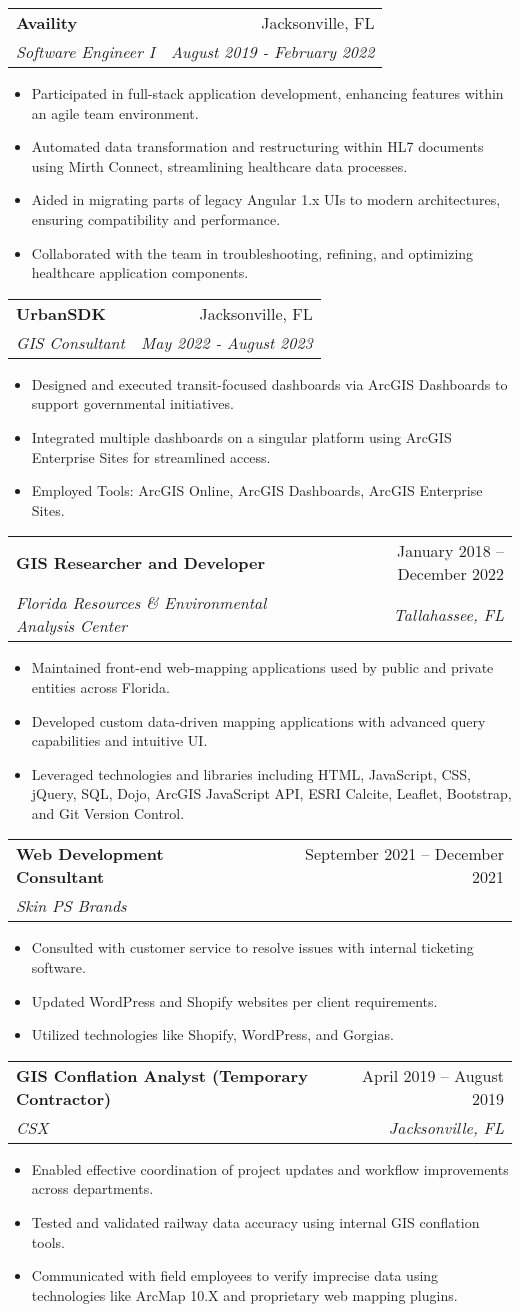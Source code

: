 \documentclass[letterpaper,11pt]{article}
\makeatletter
\newcommand{\resumeItem}[1]{
  \item\small{
    {#1 \vspace{-2pt}}
  }
}
\newcommand{\resumeSubheading}[4]{
  \vspace{-2pt}\item
    \begin{tabular*}{0.97\textwidth}[t]{l@{\extracolsep{\fill}}r}
      \textbf{#1} & #2 \\
      \textit{\small#3} & \textit{\small #4} \\
    \end{tabular*}\vspace{-7pt}
}
\newcommand{\resumeItemListStart}{\begin{itemize}}
\newcommand{\resumeItemListEnd}{\end{itemize}\vspace{-5pt}}
\makeatother
\begin{document}
    \resumeSubheading
      {Availity}{Jacksonville, FL}
      {Software Engineer I}{August 2019 - February 2022}
    \resumeItemListStart
        \resumeItem{Participated in full-stack application development, enhancing features within an agile team environment.}
        \resumeItem{Automated data transformation and restructuring within HL7 documents using Mirth Connect, streamlining healthcare data processes.}
        \resumeItem{Aided in migrating parts of legacy Angular 1.x UIs to modern architectures, ensuring compatibility and performance.}
        \resumeItem{Collaborated with the team in troubleshooting, refining, and optimizing healthcare application components.}
    \resumeItemListEnd
    
    \resumeSubheading
      {UrbanSDK}{Jacksonville, FL}
      {GIS Consultant}{May 2022 - August 2023}
      \resumeItemListStart
        \resumeItem{Designed and executed transit-focused dashboards via ArcGIS Dashboards to support governmental initiatives.}
        \resumeItem{Integrated multiple dashboards on a singular platform using ArcGIS Enterprise Sites for streamlined access.}
        \resumeItem{Employed Tools: ArcGIS Online, ArcGIS Dashboards, ArcGIS Enterprise Sites.}
      \resumeItemListEnd

    \resumeSubheading
      {GIS Researcher and Developer}{January 2018 -- December 2022}
      {Florida Resources \& Environmental Analysis Center}{Tallahassee, FL}
      \resumeItemListStart
        \resumeItem{Maintained front-end web-mapping applications used by public and private entities across Florida.}
        \resumeItem{Developed custom data-driven mapping applications with advanced query capabilities and intuitive UI.}
        \resumeItem{Leveraged technologies and libraries including HTML, JavaScript, CSS, jQuery, SQL, Dojo, ArcGIS JavaScript API, ESRI Calcite, Leaflet, Bootstrap, and Git Version Control.}
      \resumeItemListEnd
      
    \resumeSubheading
      {Web Development Consultant}{September 2021 -- December 2021}
      {Skin PS Brands}{}
      \resumeItemListStart
        \resumeItem{Consulted with customer service to resolve issues with internal ticketing software.}
        \resumeItem{Updated WordPress and Shopify websites per client requirements.}
        \resumeItem{Utilized technologies like Shopify, WordPress, and Gorgias.}
      \resumeItemListEnd

    \resumeSubheading
      {GIS Conflation Analyst (Temporary Contractor)}{April 2019 -- August 2019}
      {CSX}{Jacksonville, FL}
      \resumeItemListStart
        \resumeItem{Enabled effective coordination of project updates and workflow improvements across departments.}
        \resumeItem{Tested and validated railway data accuracy using internal GIS conflation tools.}
        \resumeItem{Communicated with field employees to verify imprecise data using technologies like ArcMap 10.X and proprietary web mapping plugins.}
      \resumeItemListEnd
\end{document}
